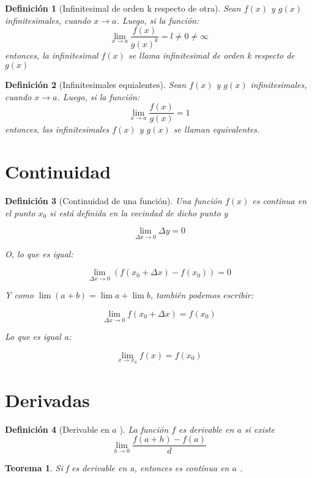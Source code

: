 \documentclass[12pt,a4paper]{article}
\newtheorem{mydef}{Definici\'on}[section]
\newtheorem{theorem}{Teorema}[section]
\begin{document}
\begin{mydef}[Infinitesimal de orden k respecto de otra]
Sean $f(x)$ y $g(x)$ infinitesimales, cuando $x \to a$. Luego, si la
funci\'on:
\[\lim_{x \to a}\frac{f(x)}{g(x)^k}=l\neq0\neq\infty\]
entonces, la infinitesimal $f(x)$ se llama \emph{infinitesimal de
  orden k respecto de} $g(x)$
\end{mydef}


\begin{mydef}[Infinitesimales equialentes]
Sean $f(x)$ y $g(x)$ infinitesimales, cuando $x \to a$. Luego, si la
funci\'on:
\[\lim_{x \to a}\frac{f(x)}{g(x)}=1\]
entonces, las infinitesimales $f(x)$ y $g(x)$ se llaman
\emph{equivalentes}.
\end{mydef}

\section{Continuidad}

\begin{mydef}[Continuidad de una funci\'on]

Una funci\'on \( f(x) \) es \emph{cont\'inua} en el punto \( x_0 \) si
est\'a definida en la vecindad de dicho punto y

\[ \lim_{\Delta x \to 0} \Delta y = 0 \]

O, lo que es igual:


\[ \lim_{\Delta x \to 0} (f(x_0+\Delta x)-f(x_0)) = 0 \]

Y como \( \lim(a+b) = \lim a + \lim b \), tambi\'en podemos escribir:

\[ \lim_{\Delta x \to 0} f(x_0+ \Delta x) = f(x_0) \]

Lo que es igual a:

\[ \lim_{x \to x_0} f(x) = f(x_0) \]



\end{mydef}

\section{Derivadas}

\begin{mydef}[Derivable en \( a \) ]
La funci\'on \( f \) es \emph{derivable en} \( a \)  si existe
\[ \lim_{h \to 0} \frac{f(a+h)-f(a)}{d} \] 
\end{mydef}

\begin{theorem}
Si f es derivable en a, entonces es cont\'inua en \( a \) .
\end{theorem}
\end{document}
